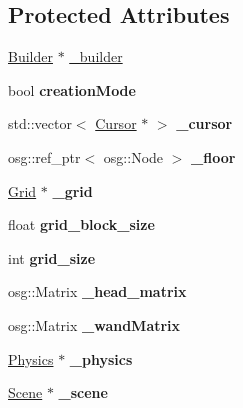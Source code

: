 \subsection*{Protected Attributes}
\begin{DoxyCompactItemize}
\item 
\hyperlink{class_builder}{Builder} $\ast$ \hyperlink{class_scene_manager_acb4ad5602b925a2c35f1e46c85a20daa}{\_\-builder}
\item 
\hypertarget{class_scene_manager_ab07cbeb3d57da5d655cce9a4b6c8387c}{
bool {\bfseries creationMode}}
\label{class_scene_manager_ab07cbeb3d57da5d655cce9a4b6c8387c}

\item 
\hypertarget{class_scene_manager_aa7befb85ebad589a71ffb9ddb29c7f8b}{
std::vector$<$ \hyperlink{class_cursor}{Cursor} $\ast$ $>$ {\bfseries \_\-cursor}}
\label{class_scene_manager_aa7befb85ebad589a71ffb9ddb29c7f8b}

\item 
\hypertarget{class_scene_manager_ac53362a783c70233f0187590c601c39a}{
osg::ref\_\-ptr$<$ osg::Node $>$ {\bfseries \_\-floor}}
\label{class_scene_manager_ac53362a783c70233f0187590c601c39a}

\item 
\hypertarget{class_scene_manager_aa245c4faccdb0db414c0349265e9ce32}{
\hyperlink{class_grid}{Grid} $\ast$ {\bfseries \_\-grid}}
\label{class_scene_manager_aa245c4faccdb0db414c0349265e9ce32}

\item 
\hypertarget{class_scene_manager_aadb6755ef26818dbaa11f7ae99e50664}{
float {\bfseries grid\_\-block\_\-size}}
\label{class_scene_manager_aadb6755ef26818dbaa11f7ae99e50664}

\item 
\hypertarget{class_scene_manager_af8d5a406ab576b9c88250eda8e0a63fe}{
int {\bfseries grid\_\-size}}
\label{class_scene_manager_af8d5a406ab576b9c88250eda8e0a63fe}

\item 
\hypertarget{class_scene_manager_af4e51f0d7e74ad776491743043f1fc7b}{
osg::Matrix {\bfseries \_\-head\_\-matrix}}
\label{class_scene_manager_af4e51f0d7e74ad776491743043f1fc7b}

\item 
\hypertarget{class_scene_manager_aa8ad311a20c82b04d3a0c9a391c99a55}{
osg::Matrix {\bfseries \_\-wandMatrix}}
\label{class_scene_manager_aa8ad311a20c82b04d3a0c9a391c99a55}

\item 
\hypertarget{class_scene_manager_ad973406aaa493b02f6d8e829d55f6b3e}{
\hyperlink{class_physics}{Physics} $\ast$ {\bfseries \_\-physics}}
\label{class_scene_manager_ad973406aaa493b02f6d8e829d55f6b3e}

\item 
\hypertarget{class_scene_manager_a2f9612924ec0bec2b3a64fa590321e07}{
\hyperlink{class_scene}{Scene} $\ast$ {\bfseries \_\-scene}}
\label{class_scene_manager_a2f9612924ec0bec2b3a64fa590321e07}

\end{DoxyCompactItemize}


